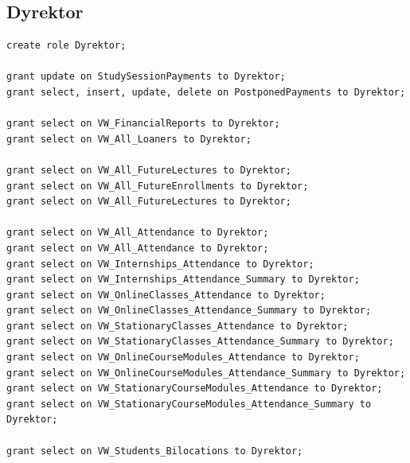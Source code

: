 \documentclass[11pt,a4paper]{article}
\begin{document}
\subsection{Dyrektor}
\begin{Verbatim}
create role Dyrektor;

grant update on StudySessionPayments to Dyrektor;
grant select, insert, update, delete on PostponedPayments to Dyrektor;

grant select on VW_FinancialReports to Dyrektor;
grant select on VW_All_Loaners to Dyrektor;

grant select on VW_All_FutureLectures to Dyrektor;
grant select on VW_All_FutureEnrollments to Dyrektor;
grant select on VW_All_FutureLectures to Dyrektor;

grant select on VW_All_Attendance to Dyrektor;
grant select on VW_All_Attendance to Dyrektor;
grant select on VW_Internships_Attendance to Dyrektor;
grant select on VW_Internships_Attendance_Summary to Dyrektor;
grant select on VW_OnlineClasses_Attendance to Dyrektor;
grant select on VW_OnlineClasses_Attendance_Summary to Dyrektor;
grant select on VW_StationaryClasses_Attendance to Dyrektor;
grant select on VW_StationaryClasses_Attendance_Summary to Dyrektor;
grant select on VW_OnlineCourseModules_Attendance to Dyrektor;
grant select on VW_OnlineCourseModules_Attendance_Summary to Dyrektor;
grant select on VW_StationaryCourseModules_Attendance to Dyrektor;
grant select on VW_StationaryCourseModules_Attendance_Summary to Dyrektor;

grant select on VW_Students_Bilocations to Dyrektor;
\end{Verbatim}
\end{document}
